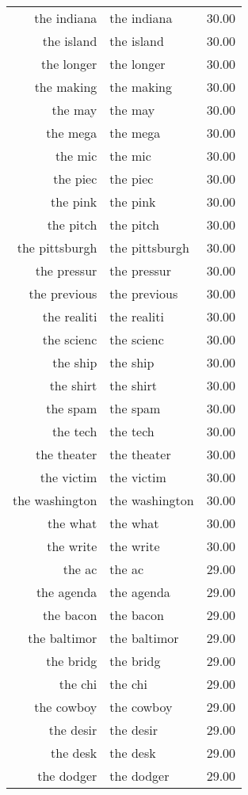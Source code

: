 \begin{table}[ht]
\begin{tabular}{rlr}
  the indiana & the indiana & 30.00 \\ 
  the island & the island & 30.00 \\ 
  the longer & the longer & 30.00 \\ 
  the making & the making & 30.00 \\ 
  the may & the may & 30.00 \\ 
  the mega & the mega & 30.00 \\ 
  the mic & the mic & 30.00 \\ 
  the piec & the piec & 30.00 \\ 
  the pink & the pink & 30.00 \\ 
  the pitch & the pitch & 30.00 \\ 
  the pittsburgh & the pittsburgh & 30.00 \\ 
  the pressur & the pressur & 30.00 \\ 
  the previous & the previous & 30.00 \\ 
  the realiti & the realiti & 30.00 \\ 
  the scienc & the scienc & 30.00 \\ 
  the ship & the ship & 30.00 \\ 
  the shirt & the shirt & 30.00 \\ 
  the spam & the spam & 30.00 \\ 
  the tech & the tech & 30.00 \\ 
  the theater & the theater & 30.00 \\ 
  the victim & the victim & 30.00 \\ 
  the washington & the washington & 30.00 \\ 
  the what & the what & 30.00 \\ 
  the write & the write & 30.00 \\ 
  the ac & the ac & 29.00 \\ 
  the agenda & the agenda & 29.00 \\ 
  the bacon & the bacon & 29.00 \\ 
  the baltimor & the baltimor & 29.00 \\ 
  the bridg & the bridg & 29.00 \\ 
  the chi & the chi & 29.00 \\ 
  the cowboy & the cowboy & 29.00 \\ 
  the desir & the desir & 29.00 \\ 
  the desk & the desk & 29.00 \\ 
  the dodger & the dodger & 29.00 \\ 

\end{tabular}
\end{table}
